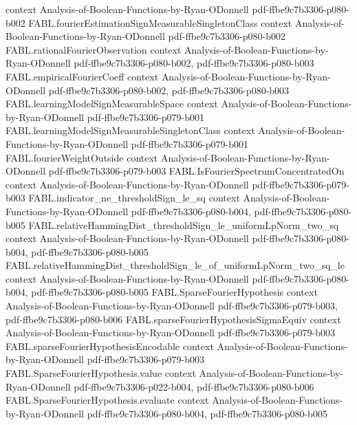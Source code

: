 \begin{theorem}
  {context}
  {Analysis-of-Boolean-Functions-by-Ryan-ODonnell}
  {pdf-ffbe9c7b3306-p080-b002}
\proofstep
  {FABL.fourierEstimationSignMeasurableSingletonClass}
  {context}
  {Analysis-of-Boolean-Functions-by-Ryan-ODonnell}
  {pdf-ffbe9c7b3306-p080-b002}
\proofstep
  {FABL.rationalFourierObservation}
  {context}
  {Analysis-of-Boolean-Functions-by-Ryan-ODonnell}
  {pdf-ffbe9c7b3306-p080-b002,
    pdf-ffbe9c7b3306-p080-b003}
\proofstep
  {FABL.empiricalFourierCoeff}
  {context}
  {Analysis-of-Boolean-Functions-by-Ryan-ODonnell}
  {pdf-ffbe9c7b3306-p080-b002,
    pdf-ffbe9c7b3306-p080-b003}
\proofstep
  {FABL.learningModelSignMeasurableSpace}
  {context}
  {Analysis-of-Boolean-Functions-by-Ryan-ODonnell}
  {pdf-ffbe9c7b3306-p079-b001}
\proofstep
  {FABL.learningModelSignMeasurableSingletonClass}
  {context}
  {Analysis-of-Boolean-Functions-by-Ryan-ODonnell}
  {pdf-ffbe9c7b3306-p079-b001}
\proofstep
  {FABL.fourierWeightOutside}
  {context}
  {Analysis-of-Boolean-Functions-by-Ryan-ODonnell}
  {pdf-ffbe9c7b3306-p079-b003}
\proofstep
  {FABL.IsFourierSpectrumConcentratedOn}
  {context}
  {Analysis-of-Boolean-Functions-by-Ryan-ODonnell}
  {pdf-ffbe9c7b3306-p079-b003}
\proofstep
  {FABL.indicator_ne_thresholdSign_le_sq}
  {context}
  {Analysis-of-Boolean-Functions-by-Ryan-ODonnell}
  {pdf-ffbe9c7b3306-p080-b004,
    pdf-ffbe9c7b3306-p080-b005}
\proofstep
  {FABL.relativeHammingDist_thresholdSign_le_uniformLpNorm_two_sq}
  {context}
  {Analysis-of-Boolean-Functions-by-Ryan-ODonnell}
  {pdf-ffbe9c7b3306-p080-b004,
    pdf-ffbe9c7b3306-p080-b005}
\proofstep
  {FABL.relativeHammingDist_thresholdSign_le_of_uniformLpNorm_two_sq_le}
  {context}
  {Analysis-of-Boolean-Functions-by-Ryan-ODonnell}
  {pdf-ffbe9c7b3306-p080-b004,
    pdf-ffbe9c7b3306-p080-b005}
\proofstep
  {FABL.SparseFourierHypothesis}
  {context}
  {Analysis-of-Boolean-Functions-by-Ryan-ODonnell}
  {pdf-ffbe9c7b3306-p079-b003,
    pdf-ffbe9c7b3306-p080-b006}
\proofstep
  {FABL.sparseFourierHypothesisSigmaEquiv}
  {context}
  {Analysis-of-Boolean-Functions-by-Ryan-ODonnell}
  {pdf-ffbe9c7b3306-p079-b003}
\proofstep
  {FABL.sparseFourierHypothesisEncodable}
  {context}
  {Analysis-of-Boolean-Functions-by-Ryan-ODonnell}
  {pdf-ffbe9c7b3306-p079-b003}
\proofstep
  {FABL.SparseFourierHypothesis.value}
  {context}
  {Analysis-of-Boolean-Functions-by-Ryan-ODonnell}
  {pdf-ffbe9c7b3306-p022-b004,
    pdf-ffbe9c7b3306-p080-b006}
\proofstep
  {FABL.SparseFourierHypothesis.evaluate}
  {context}
  {Analysis-of-Boolean-Functions-by-Ryan-ODonnell}
  {pdf-ffbe9c7b3306-p080-b004,
    pdf-ffbe9c7b3306-p080-b005}
\proofstep

\end{theorem}

